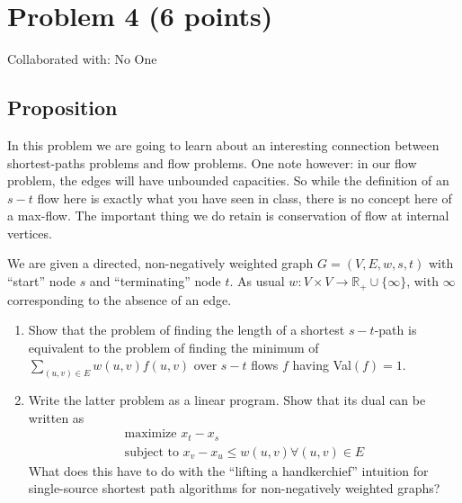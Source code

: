\documentclass{article}
\newcommand{\RR}{\mathbb{R}} %
\begin{document}
\newpage


\section{Problem 4 (6 points)}
Collaborated with: No One

\subsection{Proposition}
In this problem we are going to learn about an interesting connection between
shortest-paths problems and flow problems. One note however: in our flow problem, the
edges will have unbounded capacities. So while the definition of an \(s-t\) flow here is
exactly what you have seen in class, there is no concept here of a max-flow. The important
thing we do retain is conservation of flow at internal vertices. 

We are given a directed, non-negatively weighted graph \(G = (V, E, w, s, t)\) with
``start'' node \(s\) and ``terminating'' node \(t\). As usual \(w: V \times V \rightarrow
\RR_+ \cup \{ \infty \} \), with \(\infty \) corresponding to the absence of an edge. 

\begin{enumerate}[label= (\alph*)]
      \item Show that the problem of finding the length of a shortest \(s-t\)-path is
      equivalent to the problem of finding the minimum of \(\sum_{(u,v) \in E} w(u,v)
      f(u,v)\) over \(s-t\) flows \(f\) having Val\((f) = 1\).
      \item Write the latter problem as a linear program. Show that its dual can be
      written as \[ 
            \begin{array}{c}
            \text{maximize }  x_t - x_s \\ 
            \text{subject to }  x_v - x_u \leq w(u,v) \forall (u,v) \in E
      \end{array}
            \]
      What does this have to do with the ``lifting a handkerchief'' intuition for
      single-source shortest path algorithms for non-negatively weighted graphs? 
\end{enumerate}
\end{document}
